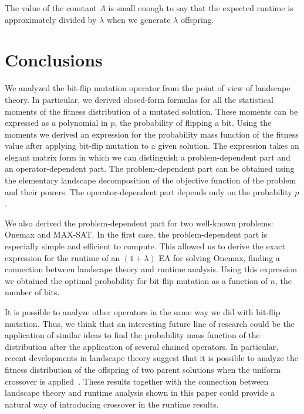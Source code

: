 \documentclass{article}
\begin{document}
The value of the constant $A$ is small enough to say that the expected runtime is approximately divided by $\lambda$ when we generate $\lambda$ offspring. 





\section{Conclusions}
\label{sec:conclusions}

We analyzed the bit-flip mutation operator from the point of view of landscape theory. In particular, we derived closed-form formulas for all the statistical moments of the fitness distribution of a mutated solution. These moments can be expressed as a polynomial in $p$, the probability of flipping a bit. Using the moments we derived an expression for the probability mass function of the fitness value after applying bit-flip mutation to a given solution. The expression takes an elegant matrix form in which we can distinguish a problem-dependent part and an operator-dependent part. The problem-dependent part can be obtained using the elementary landscape decomposition of the objective function of the problem and their powers. The operator-dependent part depends only on the probability $p$.

We also derived the problem-dependent part for two well-known problems: Onemax and MAX-SAT. In the first case, the problem-dependent part is especially simple and efficient to compute. This allowed us to derive the exact expression for the runtime of an $(1+\lambda)$ EA for solving Onemax, finding a connection between landscape theory and runtime analysis. Using this expression we obtained the optimal probability for bit-flip mutation as a function of $n$, the number of bits.

It is possible to analyze other operators in the same way we did with bit-flip mutation. Thus, we think that an interesting future line of research could be the application of similar ideas to find the probability mass function of the distribution after the application of several chained operators. In particular, recent developments in landscape theory suggest that it is possible to analyze the fitness distribution of the offspring of two parent solutions when the uniform crossover is applied~\citep{Chicano2012crossover}. These results together with the connection between landscape theory and runtime analysis shown in this paper could provide a natural way of introducing crossover in the runtime results. 
\end{document}
